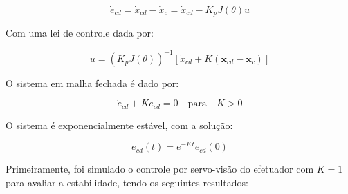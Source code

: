 \documentclass[10pt]{article}
\begin{document}
\begin{equation}
\dot{e}_{cd} = \dot{x}_{cd} - \dot{x}_c = \dot{x}_{cd} - K_p J(\theta) u
\end{equation}

Com uma lei de controle dada por:

\begin{equation}
u = (K_p J(\theta))^{-1} \left[ \dot{x}_{cd} + K ( \mathbf{x}_{cd} - \mathbf{x}_c ) \right]
\end{equation}

O sistema em malha fechada é dado por:

\begin{equation}
\dot{e}_{cd} + K e_{cd} = 0 \quad \text{para} \quad K > 0
\end{equation}

O sistema é exponencialmente estável, com a solução:

\begin{equation}
e_{cd}(t) = e^{-Kt} e_{cd}(0)
\end{equation}

Primeiramente, foi simulado o controle por servo-visão do efetuador com $K = 1$ para avaliar a estabilidade, tendo os seguintes resultados:
\end{document}
